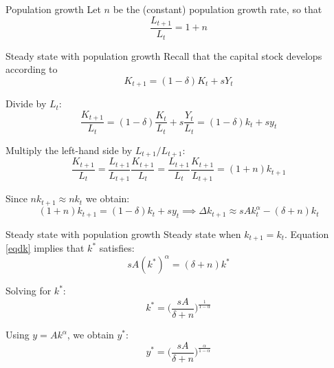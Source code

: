 \documentclass[10pt]{beamer}
\begin{document}
\begin{frame}{Population growth}
Let $n$ be the (constant) population growth rate, so that
\begin{equation*}
    \frac{L_{t+1}}{L_t}=1+n
\end{equation*}
\end{frame}


\begin{frame}{Steady state with population growth}
    Recall that the capital stock develops according to
    \begin{equation}\label{dK}
        K_{t+1}=(1-\delta)K_t+sY_t
    \end{equation}

    Divide by $L_t$:
    \begin{equation*}
        \frac{K_{t+1}}{L_t} = (1-\delta) \frac{K_t}{L_t} + s \frac{Y_t}{L_t} = (1-\delta) k_t + s y_t
    \end{equation*}

    Multiply the left-hand side by $L_{t+1}/L_{t+1}$:
    \begin{equation*}
        \frac{K_{t+1}}{L_t} = \frac{L_{t+1}}{L_{t+1}} \frac{K_{t+1}}{L_t} = \frac{L_{t+1}}{L_t} \frac{K_{t+1}}{L_{t+1}} = (1+n) k_{t+1}
    \end{equation*}\smallskip

    Since $nk_{t+1} \approx nk_t $ we obtain:
    \begin{equation}\label{eqdk}
        (1+n) k_{t+1} = (1-\delta) k_t + s y_t \implies \Delta k_{t+1} \approx s A k_t^\alpha - (\delta + n) k_t
    \end{equation}
\end{frame}


\begin{frame}{Steady state with population growth}
    Steady state when $k_{t+1}=k_t$. Equation \eqref{eqdk} implies that $k^{*}$ satisfies:
    \begin{equation*}
        sA(k^{*})^\alpha =(\delta + n) k^{*}
    \end{equation*}

    Solving for $k^{*}$:
    \begin{equation}\label{eqkss}
        k^{*} = \bigg( \frac{sA}{\delta + n} \bigg)^{\frac{1}{1-\alpha}}
    \end{equation}

    Using $y=Ak^\alpha$, we obtain $y^{*}$: 
    \begin{equation}\label{eqyss}
        y^{*} = \bigg( \frac{sA}{\delta + n} \bigg)^{\frac{\alpha}{1-\alpha}}
    \end{equation}
\end{frame}
\end{document}
